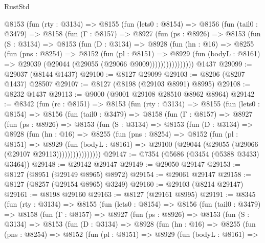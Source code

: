 \begin{lexlean}{RustStd}
\begin{coremodule}
      @8153
        (fun (rty : @3134) =>
        @8155
          (fun (lets0 : @8154) =>
          @8156
            (fun (tail0 : @3479) =>
            @8158
              (fun (Γ : @8157) =>
              @8927
                (fun (ps : @8926) =>
                @8153
                  (fun (S : @3134) =>
                  @8153
                    (fun (D : @3134) =>
                    @8928
                      (fun (hn : @16) =>
                      @8255
                        (fun (pns : @8254) =>
                        @8152
                          (fun (pl : @8151) =>
                          @8929
                            (fun (bodyL : @8161) =>
                            @29039 (@29044 (@29055 (@29066 @9009))))))))))))))))
    @1437
@29099 := @29037 (@8144 @1437)
@29100 := @8127 @29099
@29103 := @8206 (@8207 @1437) @28507
@29107 := @8127 (@8198 (@29103 @8991) @8995)
@29108 := @8232 @1437
@29113 := @9000 (@9001 @29108 @28510 @8962 @8964)
@29142 := @8342
    (fun (rc : @8151) =>
    @8153
      (fun (rty : @3134) =>
      @8155
        (fun (lets0 : @8154) =>
        @8156
          (fun (tail0 : @3479) =>
          @8158
            (fun (Γ : @8157) =>
            @8927
              (fun (ps : @8926) =>
              @8153
                (fun (S : @3134) =>
                @8153
                  (fun (D : @3134) =>
                  @8928
                    (fun (hn : @16) =>
                    @8255
                      (fun (pns : @8254) =>
                      @8152
                        (fun (pl : @8151) =>
                        @8929
                          (fun (bodyL : @8161) =>
                          @29100 (@29044 (@29055 (@29066 (@29107 @29113))))))))))))))))
@29147 := @7354 (@5686 (@3454 (@5388 @3433) @3464))
@29148 := @29142 @29147
@29149 := @29050 @29147
@29153 := @8127 (@8951 (@29149 @8965) @8972)
@29154 := @29061 @29147
@29158 := @8127 (@8257 (@29154 @8965) @3249)
@29160 := @29103 (@8214 @29147)
@29161 := @8198 @29160
@29163 := @8127 (@29161 @8995)
@29191 := @8345
    (fun (rty : @3134) =>
    @8155
      (fun (lets0 : @8154) =>
      @8156
        (fun (tail0 : @3479) =>
        @8158
          (fun (Γ : @8157) =>
          @8927
            (fun (ps : @8926) =>
            @8153
              (fun (S : @3134) =>
              @8153
                (fun (D : @3134) =>
                @8928
                  (fun (hn : @16) =>
                  @8255
                    (fun (pns : @8254) =>
                    @8152
                      (fun (pl : @8151) =>
                      @8929
                        (fun (bodyL : @8161) =>

\end{coremodule}
\end{lexlean}
